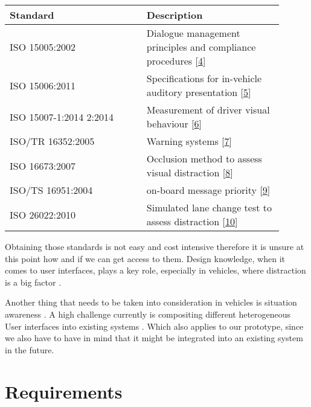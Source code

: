 \documentclass[hidelinks]{sig-alternate}
\begin{document}
\vspace{3mm}
\noindent
\def\arraystretch{1.2}
\begin{tabular}{p{0.45\linewidth} | p{0.45\linewidth}}
Standard & Description \\\hline
ISO 15005:2002 & Dialogue management principles and compliance procedures [\href{http://www.iso.org/iso/home/store/catalogue_tc/catalogue_detail.htm?csnumber=34085}{4}]\\\hline
ISO 15006:2011 & Specifications for in-vehicle auditory presentation [\href{http://www.iso.org/iso/home/store/catalogue_tc/catalogue_detail.htm?csnumber=55322}{5}]\\\hline
ISO 15007-1:2014 2:2014 & Measurement of driver visual behaviour [\href{http://www.iso.org/iso/home/store/catalogue_tc/catalogue_detail.htm?csnumber=63220}{6}]\\\hline
ISO/TR 16352:2005 & Warning systems [\href{http://www.iso.org/iso/home/store/catalogue_tc/catalogue_detail.htm?csnumber=37859}{7}]\\\hline
ISO 16673:2007 & Occlusion method to assess visual distraction [\href{http://www.iso.org/iso/home/store/catalogue_tc/catalogue_detail.htm?csnumber=38035\#5}{8}]\\\hline
ISO/TS 16951:2004 & on-board message priority [\href{http://www.iso.org/iso/home/store/catalogue_tc/catalogue_detail.htm?csnumber=29024}{9}] \\\hline
ISO 26022:2010 & Simulated lane change test to assess distraction [\href{http://www.iso.org/iso/home/store/catalogue_tc/catalogue_detail.htm?csnumber=43361}{10}]
\end{tabular}
\vspace{3mm}

Obtaining those standards is not easy and cost intensive therefore it is unsure at this point how and if we can get
access to them. Design knowledge, when it comes to  user interfaces, plays a key role, especially in vehicles, where
distraction is a big factor  \cite{Developmentofanautomotiveuserinterfacedesignknowledgesystem}.

Another thing that needs to be taken into consideration in vehicles is situation awareness \cite{Skrypchuk2016}. A
high challenge currently is compositing different heterogeneous User interfaces into existing systems
\cite{Holstein2015}. Which also applies to our prototype, since we also have to have in mind that it might be
integrated into an existing system in the future.


\section{Requirements}
\end{document}
